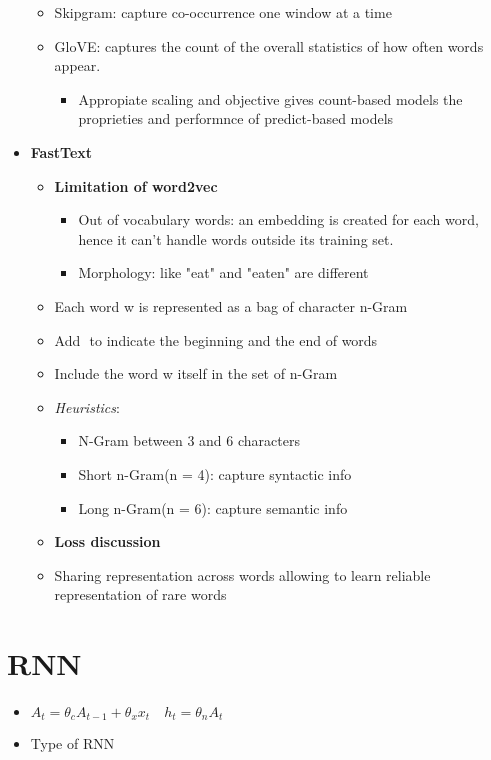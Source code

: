 \begin{itemize}
    \begin{itemize}
        \item Skipgram: capture co-occurrence one window at a time
        \item GloVE: captures the count of the overall statistics of how often words appear.
        \begin{itemize}
            \item Appropiate scaling and objective gives count-based models the proprieties and performnce of predict-based models
        \end{itemize}
    \end{itemize}
    \item \textbf{FastText}
    \begin{itemize}
        \item \textbf{Limitation of word2vec}
        \begin{itemize}
            \item Out of vocabulary words: an embedding is created for each word, hence it can't handle words outside its training set.
            \item Morphology: like "eat" and "eaten" are different
        \end{itemize}
        \item Each word w is represented as a bag of character n-Gram
        \item Add \(< >\) to indicate the beginning and the end of words
        \item Include the word w itself in the set of n-Gram
        \item \textit{Heuristics}:
        \begin{itemize}
            \item N-Gram between 3 and 6 characters
            \item Short n-Gram(n = 4): capture syntactic info
            \item Long n-Gram(n = 6): capture semantic info
        \end{itemize}
        \item \textbf{Loss discussion}
        \item Sharing representation across words allowing to learn reliable representation of rare words
    \end{itemize}
\end{itemize}

\chapter{RNN}
\begin{itemize}
    \item \(A_t = \theta_c A_{t-1} + \theta_xx_t \quad h_t = \theta_nA_t\)
    \item Type of RNN
\end{itemize}
